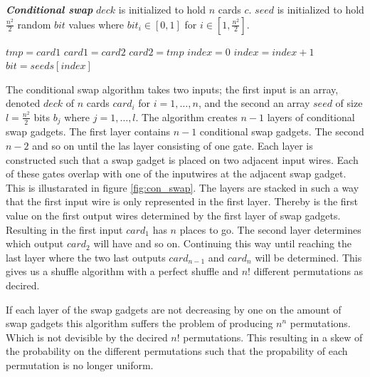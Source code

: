 \documentclass[twoside,11pt,openright]{report}
\begin{document}
\begin{algorithm}
\caption{\textbf{\textit{Conditional swap}} \newline
    $deck$ is initialized to hold $n$ cards $c$. \newline
    $seed$ is initialized to hold $\frac{n^2}{2}$ random $bit$ values where $bit_i\in[0,1]$ for $i\in [1,\frac{n^2}{2}]$.
}
\label{alg:con_swap}

\begin{algorithmic}[1]
\State $tmp = card1$
\State $card1 = card2$
\State $card2 = tmp$
\EndIf
\EndFunction
\State
{}
\State $index = 0$
\State $index = index + 1$
\State $bit = seeds[index]$
\State {}
\EndFor
\EndFor
\EndFunction
\end{algorithmic}
\end{algorithm}


The conditional swap algorithm takes two inputs; the first input is an array, denoted $deck$ of $n$ cards $card_i$ for $i=1,\dots,n$, and the second an array $seed$ of size $l=\frac{n^2}{2}$ bits $b_j$ where $j=1,\dots, l$. The algorithm creates $n-1$ layers of conditional swap gadgets. The first layer contains $n-1$ conditional swap gadgets. The second $n-2$ and so on until the las layer consisting of one gate. Each layer is constructed such that a swap gadget is placed on two adjacent input wires. Each of these gates overlap with one of the inputwires at the adjacent swap gadget. This is illustarated in figure \ref{fig:con_swap}. The layers are stacked in such a way that the first input wire is only represented in the first layer. Thereby is the first value on the first output wires determined by the first layer of swap gadgets. Resulting in the first input $card_1$ has $n$ places to go. The second layer determines which output $card_2$ will have and so on. Continuing this way until reaching the last layer where the two last outputs $card_{n-1}$ and $card_n$ will be determined. This gives us a shuffle algorithm with a perfect shuffle and $n!$ different permutations as decired.

If each layer of the swap gadgets are not decreasing by one on the amount of swap gadgets this algorithm suffers the problem of producing $n^n$ permutations. Which is not devisible by the decired $n!$ permutations. This resulting in a skew of the probability on the different permutations such that the propability of each permutation is no longer uniform.
\end{document}
